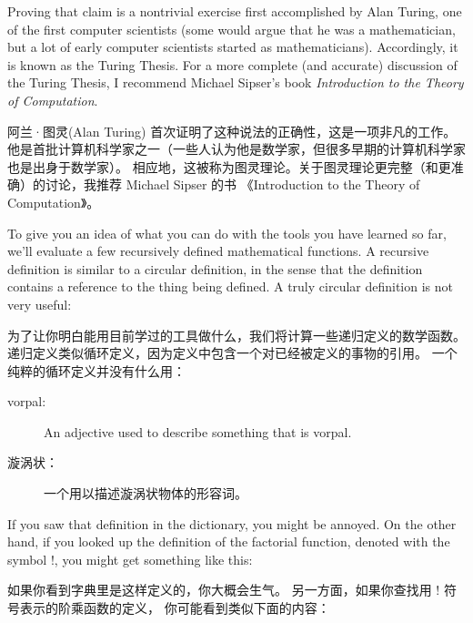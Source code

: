 Proving that claim is a nontrivial exercise first accomplished by Alan
Turing, one of the first computer scientists (some would argue that he
was a mathematician, but a lot of early computer scientists started as
mathematicians).  Accordingly, it is known as the Turing Thesis.
For a more complete (and accurate) discussion of the Turing Thesis,
I recommend Michael Sipser's book {\em Introduction to the
Theory of Computation}.

阿兰·图灵(Alan Turing) 首次证明了这种说法的正确性，这是一项非凡的工作。
他是首批计算机科学家之一（一些人认为他是数学家，但很多早期的计算机科学家也是出身于数学家）。
相应地，这被称为图灵理论。关于图灵理论更完整（和更准确）的讨论，我推荐 Michael Sipser 的书 《Introduction to the Theory of Computation》。

To give you an idea of what you can do with the tools you have learned
so far, we'll evaluate a few recursively defined mathematical
functions.  A recursive definition is similar to a circular
definition, in the sense that the definition contains a reference to
the thing being defined.  A truly circular definition is not very
useful:

为了让你明白能用目前学过的工具做什么，我们将计算一些递归定义的数学函数。
递归定义类似循环定义，因为定义中包含一个对已经被定义的事物的引用。
一个纯粹的循环定义并没有什么用：

\begin{description}

\item[vorpal:] An adjective used to describe something that is vorpal.
    

\end{description}

\begin{description}

\item[漩涡状：] 一个用以描述漩涡状物体的形容词。
    

\end{description}

If you saw that definition in the dictionary, you might be annoyed. On
the other hand, if you looked up the definition of the factorial
function, denoted with the symbol $!$, you might get something like
this:

如果你看到字典里是这样定义的，你大概会生气。
另一方面，如果你查找用 $!$ 符号表示的阶乘函数的定义， 你可能看到类似下面的内容：


